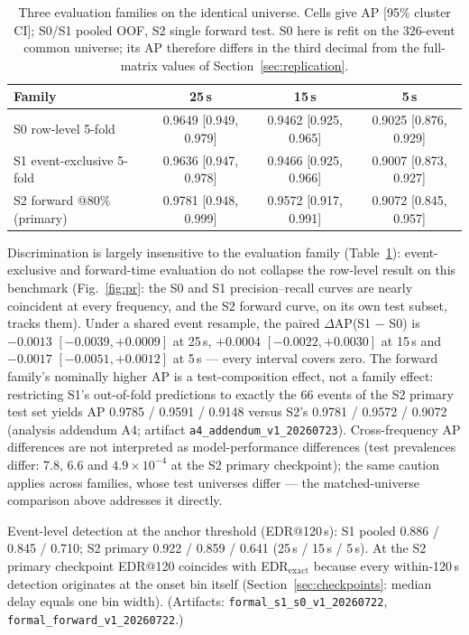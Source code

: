 \documentclass[runningheads]{llncs}
\begin{document}
\begin{table}[t]
\centering
\caption{Three evaluation families on the identical universe. Cells
give AP [95\% cluster CI]; S0/S1 pooled OOF, S2 single forward test.
S0 here is refit on the 326-event common universe; its AP therefore
differs in the third decimal from the full-matrix values of
Section~\ref{sec:replication}.}
\label{tab:families}
\scriptsize
\setlength{\tabcolsep}{3.5pt}
\begin{tabular}{lccc}
\toprule
Family & 25\,s & 15\,s & 5\,s \\
\midrule
S0 row-level 5-fold & 0.9649 [0.949, 0.979] & 0.9462 [0.925, 0.965] & 0.9025 [0.876, 0.929] \\
S1 event-exclusive 5-fold & 0.9636 [0.947, 0.978] & 0.9466 [0.925, 0.966] & 0.9007 [0.873, 0.927] \\
S2 forward @80\% (primary) & 0.9781 [0.948, 0.999] & 0.9572 [0.917, 0.991] & 0.9072 [0.845, 0.957] \\
\bottomrule
\end{tabular}
\end{table}

Discrimination is largely insensitive to the evaluation family
(Table~\ref{tab:families}): event-exclusive and forward-time evaluation
do not collapse the row-level result on this benchmark
(Fig.~\ref{fig:pr}: the S0 and S1 precision--recall curves are nearly
coincident at every frequency, and the S2 forward curve, on its own
test subset, tracks them). Under a shared event resample, the paired
$\Delta$AP(S1 $-$ S0) is $-0.0013$ $[-0.0039, +0.0009]$ at 25\,s,
$+0.0004$ $[-0.0022, +0.0030]$ at 15\,s and $-0.0017$ $[-0.0051,
+0.0012]$ at 5\,s --- every interval covers zero. The forward family's
nominally higher AP is a test-composition effect, not a family effect:
restricting S1's out-of-fold predictions to exactly the 66 events of
the S2 primary test set yields AP 0.9785 / 0.9591 / 0.9148 versus S2's
0.9781 / 0.9572 / 0.9072 (analysis addendum A4; artifact
\texttt{a4\_addendum\_v1\_20260723}). Cross-frequency AP differences
are not interpreted as model-performance differences (test prevalences
differ: 7.8, 6.6 and $4.9 \times 10^{-4}$ at the S2 primary
checkpoint); the same caution applies across families, whose test
universes differ --- the matched-universe comparison above addresses it
directly.

Event-level detection at the anchor threshold (EDR@120\,s): S1 pooled
0.886 / 0.845 / 0.710; S2 primary 0.922 / 0.859 / 0.641 (25\,s /
15\,s / 5\,s). At the S2 primary checkpoint EDR@120 coincides with
EDR$_{\mathrm{exact}}$ because every within-120\,s detection
originates at the onset bin itself (Section~\ref{sec:checkpoints}:
median delay equals one bin width). (Artifacts:
\texttt{formal\_s1\_s0\_v1\_20260722},
\texttt{formal\_forward\_v1\_20260722}.)
\end{document}
